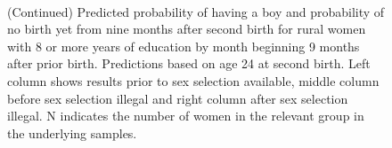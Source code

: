 \documentclass[12pt,letterpaper]{article}
\begin{document}
\begin{figure}[htpb]
{\begin{minipage}{0.31\textwidth}
        \captionsetup[subfigure]{labelformat=empty,position=top,captionskip=-1pt,farskip=-0.5pt}
        \\
        \captionsetup[subfigure]{labelformat=parens}
    \end{minipage}
}
\setcounter{subfigure}{6}
\caption{(Continued) Predicted probability of having a boy and probability of
no birth yet from nine months after second birth for rural
women with 8 or more years of education by month beginning 9 months after prior birth. 
Predictions based on age 24 at second birth.
Left column shows results prior to sex selection available, middle column before
sex selection illegal and right column after sex selection illegal.
N indicates the number of women in the relevant group in the underlying samples.
}
\end{figure}



\end{document}
